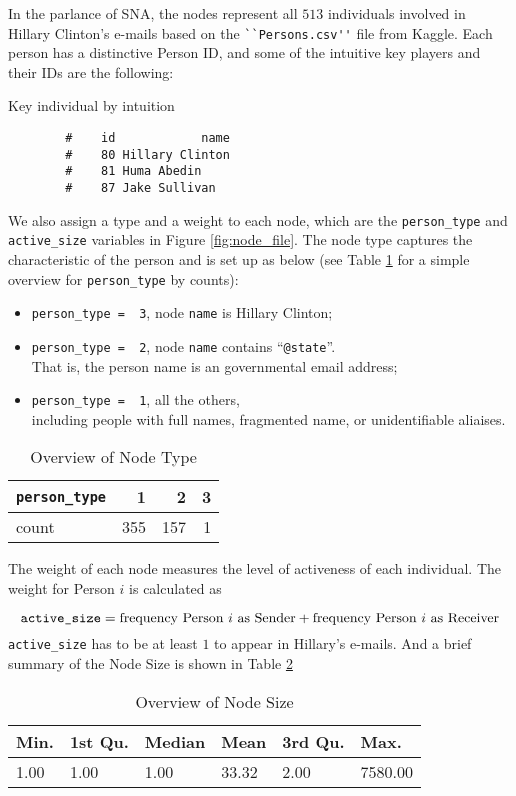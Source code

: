In the parlance of SNA, the nodes represent all $513$ individuals involved in Hillary Clinton's e-mails based on the \verb+``Persons.csv''+ file from Kaggle. Each person has a distinctive Person ID, and  some of the intuitive key players and their IDs are the following:
\begin{table}[ht]
\caption{Key individual by intuition}
\label{tab:int_key}
\centering
\begin{verbatim}
		#    id            name
		#    80 Hillary Clinton
		#    81 Huma Abedin
		#    87 Jake Sullivan
\end{verbatim}
\end{table}

We also assign a type and a weight to each node, which are the \verb+person_type+ and \verb+active_size+ variables in Figure \ref{fig:node_file}. The node type captures the characteristic of the person and is set up as below (see Table \ref{tab:node_type} for a simple overview for \verb+person_type+ by counts):
\begin{itemize}
\item \verb+person_type =  3+, node \verb+name+ is Hillary Clinton;
\item  \verb+person_type =  2+, node \verb+name+ contains ``\verb+@state+''. \\That is, the person name is an governmental email address;
\item \verb+person_type =  1+, all the others,\\
 including people with full names, fragmented name, or unidentifiable aliaises.
\end{itemize}

\begin{table}[ht]
\caption{Overview of Node Type}
\label{tab:node_type}
\centering
\begin{tabular}{l | r r r}
\verb+person_type+ & 1 & 2&3\\ \hline 
count & 355 & 157 &1
\end{tabular}
\end{table}

The weight of each node measures the level of activeness of each individual. The weight for Person $i$ is calculated as 

\begin{equation} 
\verb+active_size+ = \mbox{frequency Person $i$ as Sender} +  \mbox{frequency Person $i$ as Receiver}
\end{equation}
\verb+active_size+ has to be at least $1$ to appear in Hillary's e-mails. And a brief summary of the Node Size is shown in Table \ref{tab:node_size}
\begin{table}[ht]
\caption{Overview of Node Size}
\label{tab:node_size}
\centering
\begin{tabular}{llllll}
Min. &1st Qu. & Median&    Mean& 3rd Qu.  &  Max. \\ \hline
   1.00 &   1.00  &  1.00&   33.32 &   2.00 &7580.00 
 \end{tabular}
\end{table} 
 
